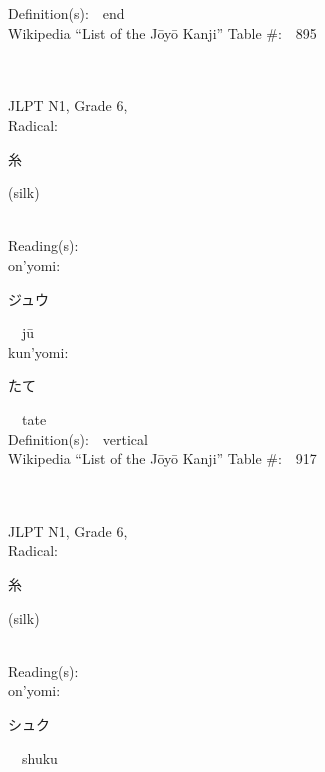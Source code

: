 \begin{multicols}{2}
Definition(s):\ \ end \\
Wikipedia ``List of the J\=oy\=o Kanji'' Table \#:\ \ 895 \\
\ \ \\
{\fontsize{34pt}{40pt}  }\ \ \\  %
{JLPT N1, Grade 6, \\Radical:\ \ {\begin{CJK}{UTF8}{min} 糸 \end{CJK}} (silk) } \\
Reading(s):\ \ \\
{\hspace*{1em}}on'yomi:\ \ \\
{\hspace*{2em}}{\begin{CJK}{UTF8}{min} ジュウ \end{CJK}}\ \ j\=u\ \ \\
{\hspace*{1em}}kun'yomi:\ \ \\
{\hspace*{2em}}{\begin{CJK}{UTF8}{min} たて \end{CJK}}\ \ tate\ \ \\
Definition(s):\ \ vertical \\
Wikipedia ``List of the J\=oy\=o Kanji'' Table \#:\ \ 917 \\
\ \ \\
{\fontsize{34pt}{40pt}  }\ \ \\  %
{JLPT N1, Grade 6, \\Radical:\ \ {\begin{CJK}{UTF8}{min} 糸 \end{CJK}} (silk) } \\
Reading(s):\ \ \\
{\hspace*{1em}}on'yomi:\ \ \\
{\hspace*{2em}}{\begin{CJK}{UTF8}{min} シュク \end{CJK}}\ \ shuku\ \ \\

\end{multicols}

